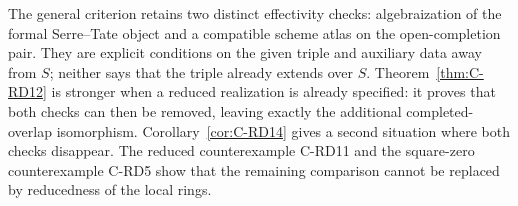 \begin{remark}
The general criterion retains two distinct effectivity checks:
algebraization of the formal Serre--Tate object and a compatible
scheme atlas on the open-completion pair. They are explicit
conditions on the given triple and auxiliary data away from $S$;
neither says that the triple already extends over $S$.
Theorem~\ref{thm:C-RD12} is stronger when a reduced realization is
already specified: it proves that both checks can then be removed,
leaving exactly the additional completed-overlap isomorphism.
Corollary~\ref{cor:C-RD14} gives a second situation where both checks
disappear. The reduced counterexample C-RD11 and the square-zero
counterexample C-RD5 show that the remaining comparison cannot be
replaced by reducedness of the local rings.
\end{remark}
